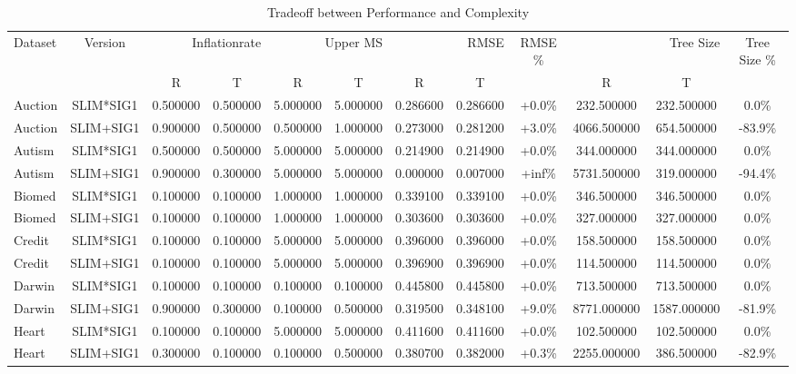 
    \begin{table}[H]
        \centering
        \renewcommand{\arraystretch}{1.2}
        \caption{Tradeoff between Performance and Complexity}
        \label{tab:RQ_Inflationrate_tradeoff}
    \begin{tabular}{lccccccccccc}
\toprule
Dataset & Version & \multicolumn{2}{r}{Inflationrate} & \multicolumn{2}{r}{Upper MS} & \multicolumn{2}{r}{RMSE} & RMSE \% & \multicolumn{2}{r}{Tree Size} & Tree Size \% \\
 &  &  R &  T &  R &  T &  R &  T &  &  R &  T &  \\
\midrule
Auction & SLIM*SIG1 & 0.500000 & 0.500000 & 5.000000 & 5.000000 & 0.286600 & 0.286600 & +0.0\% & 232.500000 & 232.500000 & 0.0\% \\
Auction & SLIM+SIG1 & 0.900000 & 0.500000 & 0.500000 & 1.000000 & 0.273000 & 0.281200 & +3.0\% & 4066.500000 & 654.500000 & -83.9\% \\
Autism & SLIM*SIG1 & 0.500000 & 0.500000 & 5.000000 & 5.000000 & 0.214900 & 0.214900 & +0.0\% & 344.000000 & 344.000000 & 0.0\% \\
Autism & SLIM+SIG1 & 0.900000 & 0.300000 & 5.000000 & 5.000000 & 0.000000 & 0.007000 & +inf\% & 5731.500000 & 319.000000 & -94.4\% \\
Biomed & SLIM*SIG1 & 0.100000 & 0.100000 & 1.000000 & 1.000000 & 0.339100 & 0.339100 & +0.0\% & 346.500000 & 346.500000 & 0.0\% \\
Biomed & SLIM+SIG1 & 0.100000 & 0.100000 & 1.000000 & 1.000000 & 0.303600 & 0.303600 & +0.0\% & 327.000000 & 327.000000 & 0.0\% \\
Credit & SLIM*SIG1 & 0.100000 & 0.100000 & 5.000000 & 5.000000 & 0.396000 & 0.396000 & +0.0\% & 158.500000 & 158.500000 & 0.0\% \\
Credit & SLIM+SIG1 & 0.100000 & 0.100000 & 5.000000 & 5.000000 & 0.396900 & 0.396900 & +0.0\% & 114.500000 & 114.500000 & 0.0\% \\
Darwin & SLIM*SIG1 & 0.100000 & 0.100000 & 0.100000 & 0.100000 & 0.445800 & 0.445800 & +0.0\% & 713.500000 & 713.500000 & 0.0\% \\
Darwin & SLIM+SIG1 & 0.900000 & 0.300000 & 0.100000 & 0.500000 & 0.319500 & 0.348100 & +9.0\% & 8771.000000 & 1587.000000 & -81.9\% \\
Heart & SLIM*SIG1 & 0.100000 & 0.100000 & 5.000000 & 5.000000 & 0.411600 & 0.411600 & +0.0\% & 102.500000 & 102.500000 & 0.0\% \\
Heart & SLIM+SIG1 & 0.300000 & 0.100000 & 0.100000 & 0.500000 & 0.380700 & 0.382000 & +0.3\% & 2255.000000 & 386.500000 & -82.9\% \\

\end{tabular}
\end{table}
